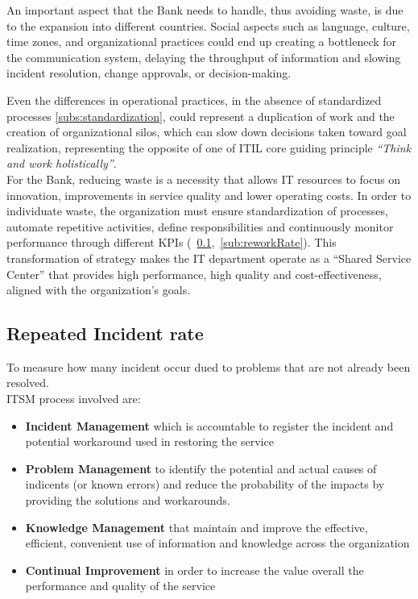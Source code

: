 An important aspect that the Bank needs to handle, thus avoiding waste, is due to the expansion into different countries. Social aspects such as language, culture, time zones, and organizational practices could end up creating a bottleneck for the communication system, delaying the throughput of information and slowing incident resolution, change approvals, or decision-making.


Even the differences in operational practices, in the absence of standardized processes \ref{subs:standardization}, could represent a duplication of work and the creation of organizational silos, which can slow down decisions taken toward goal realization, representing the opposite of one of ITIL core guiding principle \textit{``Think and work holistically''}. \\
For the Bank, reducing waste is a necessity that allows IT resources to focus on innovation, improvements in service quality and lower operating costs. In order to individuate waste, the organization must ensure standardization of processes, automate repetitive activities, define responsibilities and continuously monitor performance through different KPIs (~\ref{sub:repeatedIncident},~\ref{sub:reworkRate}). This transformation of strategy makes the IT department operate as a ``Shared Service Center'' that provides high performance, high quality and cost-effectiveness, aligned with the organization's goals.

\subsection{Repeated Incident rate}
\label{sub:repeatedIncident}
    To measure how many incident occur dued to problems that are not already been resolved.\\
    ITSM process involved are:

    \begin{itemize}
        \item \textbf{Incident Management} which is accountable to register the incident and potential workaround used in restoring the service
        \item \textbf{Problem Management} to identify the potential and actual causes of indicents (or known errors) and reduce the probability of the impacts by providing the solutions and workarounds.
        \item \textbf{Knowledge Management} that maintain and improve the eﬀective, efficient, convenient use of information and knowledge across the organization
        \item \textbf{Continual Improvement} in order to increase the value overall the performance and quality of the service
    \end{itemize}

